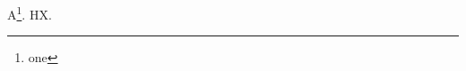 \documentclass{article}
\begin{document}
A\footnote{one}.
H\footnotemark[\the\relax] X.
\end{document}
